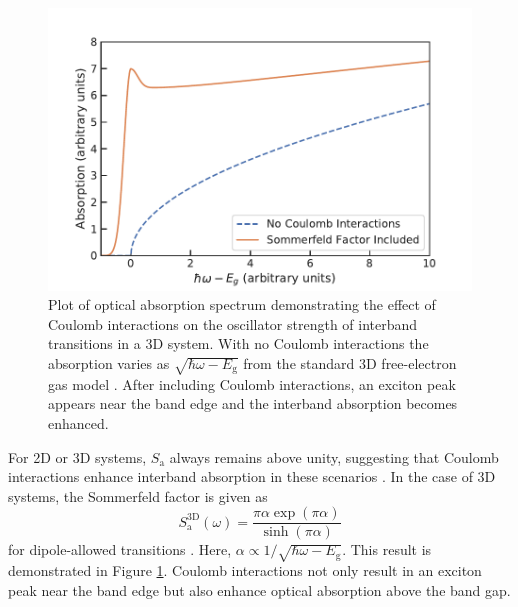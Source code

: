 \begin{figure}[ht]
	\centering
	\includegraphics[scale=0.8]{images/chapter_optical_props/Sommerfeld_Plot/coulomb_enhancement}
	\caption{Plot of optical absorption spectrum demonstrating the effect of Coulomb interactions on the oscillator strength of interband transitions in a 3D system. With no Coulomb interactions the absorption varies as $\sqrt{\hbar\omega - E_\text{g}}$ from the standard 3D free-electron gas model \cite{Ashcroft}. After including Coulomb interactions, an exciton peak appears near the band edge and the interband absorption becomes enhanced.}
	\label{fig:coulomb_enhancement_3d}
\end{figure}

For 2D or 3D systems, $S_\text{a}$ always remains above unity, suggesting that Coulomb interactions enhance interband absorption in these scenarios \cite{ogawa1991interband}. In the case of 3D systems, the Sommerfeld factor is given as
\begin{equation}
	S_\text{a}^\text{3D}(\omega) = \frac{\pi \alpha \exp(\pi \alpha)}{\sinh(\pi \alpha)}
\end{equation}
for dipole-allowed transitions \cite{elliott1957intensity}. Here, $\alpha \propto 1/\sqrt{\hbar\omega - E_\text{g}}$. This result is demonstrated in Figure \ref{fig:coulomb_enhancement_3d}. Coulomb interactions not only result in an exciton peak near the band edge but also enhance optical absorption above the band gap.


